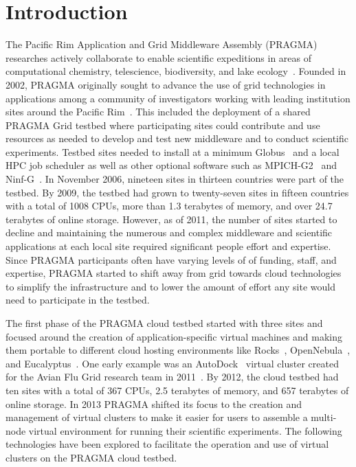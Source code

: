 \documentclass{acm_proc_article-sp}
\begin{document}


\section{Introduction}
\label{Sec:intro}

The Pacific Rim Application and Grid Middleware Assembly (PRAGMA) researches actively collaborate to enable scientific expeditions in areas of computational chemistry, telescience, biodiversity, and lake ecology~\cite{pragmaWeb}.  Founded in 2002, PRAGMA originally sought to advance the use of grid technologies in applications among a community of investigators working with leading institution sites around the Pacific Rim~\cite{pragmaReport2004}.  This included the deployment of a shared PRAGMA Grid testbed where participating sites could contribute and use resources as needed to develop and test new middleware and to conduct scientific experiments.  Testbed sites needed to install at a minimum Globus~\cite{globus} and a local HPC job scheduler as well as other optional software such as MPICH-G2~\cite{mpichg2} and Ninf-G~\cite{ninfg}.  In November 2006, nineteen sites in thirteen countries were part of the testbed.  By 2009, the testbed had grown to twenty-seven sites in fifteen countries with a total of 1008 CPUs, more than 1.3 terabytes of memory, and over 24.7 terabytes of online storage.  However, as of 2011, the number of sites started to decline and maintaining the numerous and complex middleware and scientific applications at each local site required significant people effort and expertise.  Since PRAGMA participants often have varying levels of of funding, staff, and expertise, PRAGMA started to shift away from grid towards cloud technologies to simplify the infrastructure and to lower the amount of effort any site would need to participate in the testbed.  

The first phase of the PRAGMA cloud testbed started with three sites and focused around the creation of application-specific virtual machines and making them portable to  different cloud hosting environments like Rocks~\cite{rocks}, OpenNebula~\cite{opennebula}, and Eucalyptus~\cite{eucalyptus}.
One early example was an AutoDock~\cite{autodock} virtual cluster created for the Avian Flu Grid research team in 2011~\cite{pragmaReport2011}.   By 2012, the cloud testbed had ten sites with a total of 367 CPUs, 2.5 terabytes of memory, and 657 terabytes of online storage.  In 2013 PRAGMA shifted its  focus to the creation and management of virtual clusters to make it easier for users to assemble a multi-node virtual environment for running their scientific experiments.  The following technologies have been explored to facilitate the operation and use of virtual clusters on the PRAGMA cloud testbed.
\end{document}
